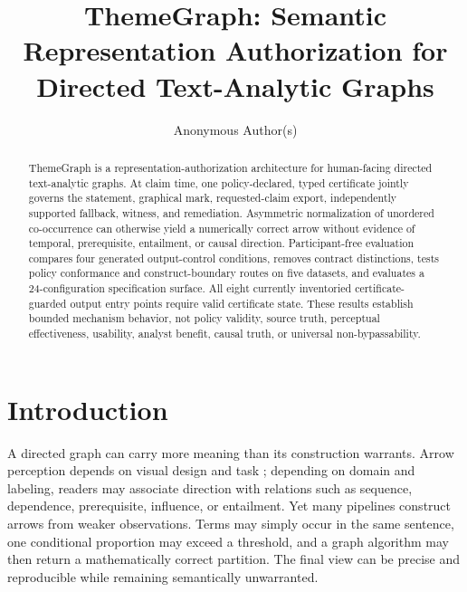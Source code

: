 \documentclass[manuscript,screen,review,anonymous]{acmart}
\begin{document}
\title{ThemeGraph: Semantic Representation Authorization for Directed Text-Analytic Graphs}

\author{Anonymous Author(s)}

\begin{abstract}
ThemeGraph is a representation-authorization architecture for human-facing directed text-analytic graphs. At claim time, one policy-declared, typed certificate jointly governs the statement, graphical mark, requested-claim export, independently supported fallback, witness, and remediation. Asymmetric normalization of unordered co-occurrence can otherwise yield a numerically correct arrow without evidence of temporal, prerequisite, entailment, or causal direction. Participant-free evaluation compares four generated output-control conditions, removes contract distinctions, tests policy conformance and construct-boundary routes on five datasets, and evaluates a 24-configuration specification surface. All eight currently inventoried certificate-guarded output entry points require valid certificate state. These results establish bounded mechanism behavior, not policy validity, source truth, perceptual effectiveness, usability, analyst benefit, causal truth, or universal non-bypassability.
\end{abstract}




\maketitle

\section{Introduction}

A directed graph can carry more meaning than its construction warrants. Arrow perception depends on visual design and task \cite{holten2009}; depending on domain and labeling, readers may associate direction with relations such as sequence, dependence, prerequisite, influence, or entailment. Yet many pipelines construct arrows from weaker observations. Terms may simply occur in the same sentence, one conditional proportion may exceed a threshold, and a graph algorithm may then return a mathematically correct partition. The final view can be precise and reproducible while remaining semantically unwarranted.
\end{document}
